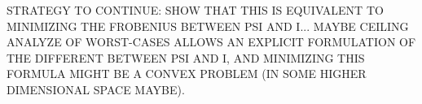 \documentclass[11pt]{scrartcl} %
\begin{document}
STRATEGY TO CONTINUE: SHOW THAT THIS IS EQUIVALENT TO MINIMIZING THE FROBENIUS BETWEEN PSI AND I... MAYBE CEILING ANALYZE OF WORST-CASES ALLOWS AN EXPLICIT FORMULATION OF THE DIFFERENT BETWEEN PSI AND I, AND MINIMIZING THIS FORMULA MIGHT BE A CONVEX PROBLEM (IN SOME HIGHER DIMENSIONAL SPACE MAYBE).




  
  
\end{document}
